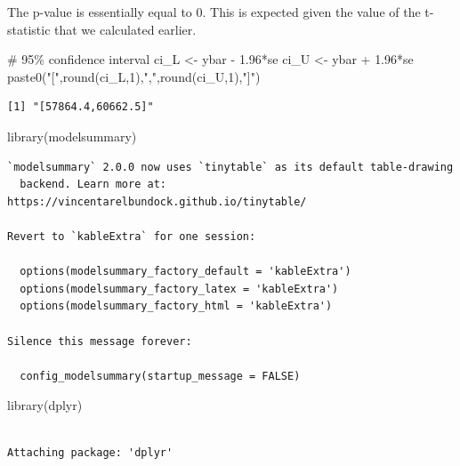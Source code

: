 \documentclass[
  letterpaper,
  DIV=11,
  numbers=noendperiod]{scrreprt}
\newenvironment{Shaded}{\begin{snugshade}}{\end{snugshade}}
\newcommand{\CommentTok}[1]{\textcolor[rgb]{0.37,0.37,0.37}{#1}}
\newcommand{\DecValTok}[1]{\textcolor[rgb]{0.68,0.00,0.00}{#1}}
\newcommand{\FloatTok}[1]{\textcolor[rgb]{0.68,0.00,0.00}{#1}}
\newcommand{\FunctionTok}[1]{\textcolor[rgb]{0.28,0.35,0.67}{#1}}
\newcommand{\NormalTok}[1]{\textcolor[rgb]{0.00,0.23,0.31}{#1}}
\newcommand{\OtherTok}[1]{\textcolor[rgb]{0.00,0.23,0.31}{#1}}
\newcommand{\SpecialCharTok}[1]{\textcolor[rgb]{0.37,0.37,0.37}{#1}}
\newcommand{\StringTok}[1]{\textcolor[rgb]{0.13,0.47,0.30}{#1}}
\begin{document}
The p-value is essentially equal to 0. This is expected given the value
of the t-statistic that we calculated earlier.

\begin{Shaded}
\begin{Highlighting}[]
\CommentTok{\# 95\% confidence interval}
\NormalTok{ci\_L }\OtherTok{\textless{}{-}}\NormalTok{ ybar }\SpecialCharTok{{-}} \FloatTok{1.96}\SpecialCharTok{*}\NormalTok{se}
\NormalTok{ci\_U }\OtherTok{\textless{}{-}}\NormalTok{ ybar }\SpecialCharTok{+} \FloatTok{1.96}\SpecialCharTok{*}\NormalTok{se}
\FunctionTok{paste0}\NormalTok{(}\StringTok{"["}\NormalTok{,}\FunctionTok{round}\NormalTok{(ci\_L,}\DecValTok{1}\NormalTok{),}\StringTok{","}\NormalTok{,}\FunctionTok{round}\NormalTok{(ci\_U,}\DecValTok{1}\NormalTok{),}\StringTok{"]"}\NormalTok{)}
\end{Highlighting}
\end{Shaded}

\begin{verbatim}
[1] "[57864.4,60662.5]"
\end{verbatim}

\begin{Shaded}
\begin{Highlighting}[]
\FunctionTok{library}\NormalTok{(modelsummary)}
\end{Highlighting}
\end{Shaded}

\begin{verbatim}
`modelsummary` 2.0.0 now uses `tinytable` as its default table-drawing
  backend. Learn more at: https://vincentarelbundock.github.io/tinytable/

Revert to `kableExtra` for one session:

  options(modelsummary_factory_default = 'kableExtra')
  options(modelsummary_factory_latex = 'kableExtra')
  options(modelsummary_factory_html = 'kableExtra')

Silence this message forever:

  config_modelsummary(startup_message = FALSE)
\end{verbatim}

\begin{Shaded}
\begin{Highlighting}[]
\FunctionTok{library}\NormalTok{(dplyr)}
\end{Highlighting}
\end{Shaded}

\begin{verbatim}

Attaching package: 'dplyr'
\end{verbatim}
\end{document}
